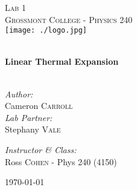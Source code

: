 \begin{titlepage}
\begin{center}

\textsc{\Large Lab 1}\\[1.5cm]
\textsc{\Large Grossmont College - Physics 240}\\[0.5cm]
\texttt{[image: ./logo.jpg]}

\HRule \\[0.4cm]
{ \LARGE \bfseries Linear Thermal Expansion}\\[0.5cm]

\HRule \\[1.5cm]

\begin{minipage}{0.4\textwidth}
\begin{flushleft} \large
\emph{Author:}\\
Cameron \textsc{Carroll} \\[0.2cm]
\emph{Lab Partner:}\\
Stephany \textsc{Vale}
\end{flushleft}
\end{minipage}
\begin{minipage}{0.4\textwidth}
\begin{flushright} \large
\emph{Instructor \& Class:}\\
Ross \textsc{Cohen} - Phys 240 (4150)
\end{flushright}
\end{minipage}

\vfill

{\large \today}

\end{center}
\end{titlepage}